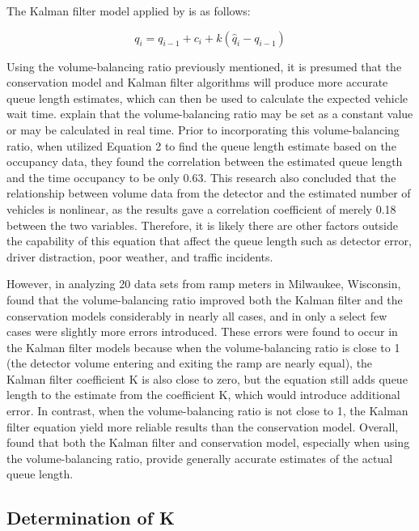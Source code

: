 \documentclass[numbered]{trbarticle}
\begin{document}
The Kalman filter model applied by \citet{wu2009experiment} is as follows:

\begin{equation}
q_i = q_{i-1} + c_i + k (\hat{q}_i - q_{i-1})
  \label{eq:kalman}
\end{equation}

Using the volume-balancing ratio previously mentioned, it is presumed that the conservation model and Kalman filter algorithms will produce more accurate queue length estimates, which can then be used to calculate the expected vehicle wait time. \citet{wu2009experiment} explain that the volume-balancing ratio may be set as a constant value or may be calculated in real time. Prior to incorporating this volume-balancing ratio, when \citet{wu2009experiment} utilized Equation 2 to find the queue length estimate based on the occupancy data, they found the correlation between the estimated queue length and the time occupancy to be only 0.63. This research also concluded that the relationship between volume data from the detector and the estimated number of vehicles is nonlinear, as the results gave a correlation coefficient of merely 0.18 between the two variables. Therefore, it is likely there are other factors outside the capability of this equation that affect the queue length such as detector error, driver distraction, poor weather, and traffic incidents.

However, in analyzing 20 data sets from ramp meters in Milwaukee, Wisconsin, \citet{wu2009experiment} found that the volume-balancing ratio improved both the Kalman filter and the conservation models considerably in nearly all cases, and in only a select few cases were slightly more errors introduced. These errors were found to occur in the Kalman filter models because when the volume-balancing ratio is close to 1 (the detector volume entering and exiting the ramp are nearly equal), the Kalman filter coefficient K is also close to zero, but the equation still adds queue length to the estimate from the coefficient K, which would introduce additional error. In contrast, when the volume-balancing ratio is not close to 1, the Kalman filter equation yield more reliable results than the conservation model. Overall, \citet{wu2009experiment} found that both the Kalman filter and conservation model, especially when using the volume-balancing ratio, provide generally accurate estimates of the actual queue length.

\hypertarget{determination-of-k}{%
\subsection{Determination of K}\label{determination-of-k}}
\end{document}
